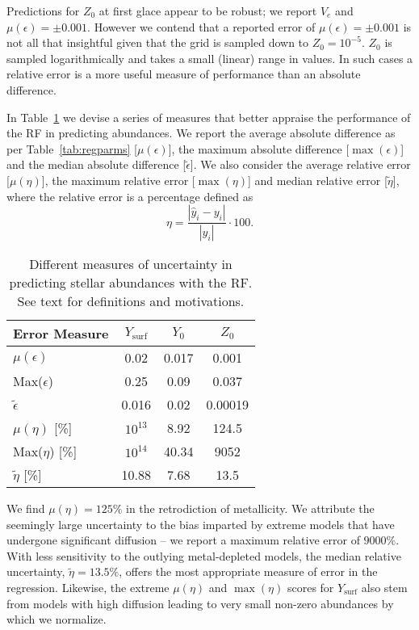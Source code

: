 Predictions for $Z_0$ at first glace appear to be robust; we report $V_e$ and  ${\mu (\epsilon) = \pm 0.001}$. However we contend that a reported error of  ${\mu (\epsilon) = \pm 0.001}$ is not all that insightful given that the grid is sampled down to ${Z_0 = 10^{-5}}$. $Z_0$ is sampled logarithmically and takes a small (linear) range in values. In such cases   a relative error is a more useful measure of performance than an absolute difference. 


In Table~\ref{tab:relabunds} we devise a series of measures that better appraise the performance of the RF in predicting abundances. We report the average absolute difference as per Table~\ref{tab:regparms} [${\mu (\epsilon)}$], the maximum absolute difference [${\max(\epsilon)}$] and the median absolute difference [${\tilde{\epsilon}}$]. We also consider the average relative error [${\mu (\eta)}$], the maximum relative error [${\max(\eta)}$] and median relative error [$\tilde{\eta}$], where the relative error is a percentage defined as
\begin{equation}
  \eta= \frac{| \hat y_i - y_i |}{|y_i|} \cdot 100.
\end{equation}


\begin{table}
\centering
\caption{Different measures of uncertainty in predicting stellar abundances with the RF. See text for definitions and motivations.}
    \begin{tabular}{lccc}
 \hline \hline
 Error Measure& $Y_{\text{surf}}$ & $Y_0$ & $Z_0$ \\ \hline
 $\mu (\epsilon)$                 & 0.02 &0.017 & 0.001 \\
 Max($\epsilon$)             & 0.25 &0.09   & 0.037\\    
$\tilde {\epsilon}$          & 0.016  &0.02     &0.00019\\
$\mu (\eta)$ [\%]       & $10^{13}$ &8.92& 124.5 \\ 
  Max($\eta$) [\%]   & $10^{14}$ &40.34  & 9052 \\
$\tilde {\eta}$  [\%] & 10.88 &7.68  & 13.5 \\
\hline
\end{tabular}
\label{tab:relabunds}
\end{table}


We find  ${\mu (\eta) = 125\%}$ in the retrodiction of metallicity. We attribute the seemingly large uncertainty to the bias imparted by extreme models that have undergone significant diffusion -- we report a maximum relative error of $9000\%$. With less sensitivity to the outlying metal-depleted models, the median relative uncertainty, ${\tilde{\eta} = 13.5\%}$, offers the most appropriate measure of error in the regression. 
Likewise, the extreme ${\mu (\eta)}$ and $\max(\eta)$ scores for $Y_{\text{surf}}$ also stem from models with high diffusion leading to very small non-zero abundances by which we normalize. 

